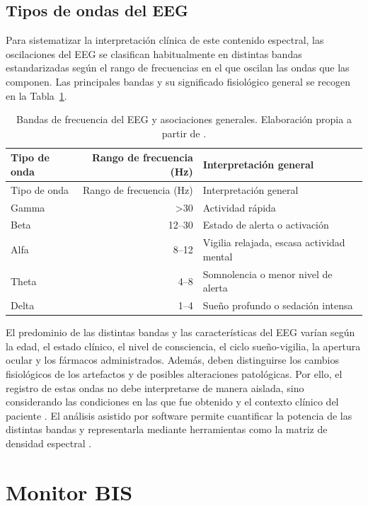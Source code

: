 \documentclass[
  spanish,
  a4paper,
  12pt,
  twoside]{memoir}
\begin{document}
\subsection{Tipos de ondas del EEG}\label{tipos-de-ondas-del-eeg}

Para sistematizar la interpretación clínica de este contenido espectral,
las oscilaciones del EEG se clasifican habitualmente en distintas bandas
estandarizadas según el rango de frecuencias en el que oscilan las ondas
que las componen. Las principales bandas y su significado fisiológico
general se recogen en la Tabla~\ref{tbl-bandas-eeg}.

\begin{longtable}[]{@{}lrl@{}}
\caption{Bandas de frecuencia del EEG y asociaciones generales.
Elaboración propia a partir de
\citet{Er2006}.}\label{tbl-bandas-eeg}\tabularnewline
\toprule\noalign{}
Tipo de onda & Rango de frecuencia (Hz) & Interpretación general \\
\midrule\noalign{}
\endfirsthead
\toprule\noalign{}
Tipo de onda & Rango de frecuencia (Hz) & Interpretación general \\
\midrule\noalign{}
\endhead
\bottomrule\noalign{}
\endlastfoot
Gamma & \textgreater30 & Actividad rápida \\
Beta & 12--30 & Estado de alerta o activación \\
Alfa & 8--12 & Vigilia relajada, escasa actividad mental \\
Theta & 4--8 & Somnolencia o menor nivel de alerta \\
Delta & 1--4 & Sueño profundo o sedación intensa \\
\end{longtable}

El predominio de las distintas bandas y las características del EEG
varían según la edad, el estado clínico, el nivel de consciencia, el
ciclo sueño-vigilia, la apertura ocular y los fármacos administrados.
Además, deben distinguirse los cambios fisiológicos de los artefactos y
de posibles alteraciones patológicas. Por ello, el registro de estas
ondas no debe interpretarse de manera aislada, sino considerando las
condiciones en las que fue obtenido y el contexto clínico del paciente
\citep{Er2006}. El análisis asistido por software permite cuantificar la
potencia de las distintas bandas y representarla mediante herramientas
como la matriz de densidad espectral \citep{Tatum2016}.

\section{Monitor BIS}\label{monitor-bis}
\end{document}
